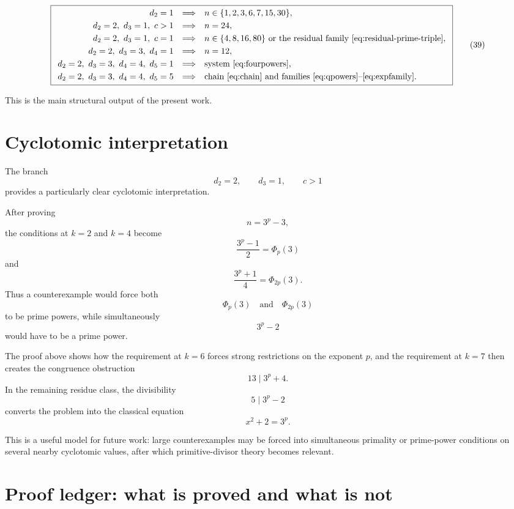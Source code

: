 \documentclass[11pt]{article}
\newcommand{\PhiC}{\Phi}
\begin{document}
\[
\boxed{
\begin{array}{rcl}
d_2=1
&\Longrightarrow&
n\in\{1,2,3,6,7,15,30\},\\[1mm]
d_2=2,\ d_3=1,\ c>1
&\Longrightarrow&
n=24,\\[1mm]
d_2=2,\ d_3=1,\ c=1
&\Longrightarrow&
n\in\{4,8,16,80\}\text{ or the residual family \eqref{eq:residual-prime-triple}},\\[1mm]
d_2=2,\ d_3=3,\ d_4=1
&\Longrightarrow&
n=12,\\[1mm]
d_2=2,\ d_3=3,\ d_4=4,\ d_5=1
&\Longrightarrow&
\text{system \eqref{eq:fourpowers}},\\[1mm]
d_2=2,\ d_3=3,\ d_4=4,\ d_5=5
&\Longrightarrow&
\text{chain \eqref{eq:chain} and families \eqref{eq:qpowers}--\eqref{eq:expfamily}}.
\end{array}
}
\tag{39}
\]

This is the main structural output of the present work.

\section{Cyclotomic interpretation}

The branch
\[
d_2=2,\qquad d_3=1,\qquad c>1
\]
provides a particularly clear cyclotomic interpretation.

After proving
\[
n=3^p-3,
\]
the conditions at \(k=2\) and \(k=4\) become
\[
\frac{3^p-1}{2}=\PhiC_p(3)
\]
and
\[
\frac{3^p+1}{4}=\PhiC_{2p}(3).
\]
Thus a counterexample would force both
\[
\PhiC_p(3)
\quad\text{and}\quad
\PhiC_{2p}(3)
\]
to be prime powers, while simultaneously
\[
3^p-2
\]
would have to be a prime power.

The proof above shows how the requirement at \(k=6\) forces strong restrictions
on the exponent \(p\), and the requirement at \(k=7\) then creates the
congruence obstruction
\[
13\mid3^p+4.
\]
In the remaining residue class, the divisibility
\[
5\mid3^p-2
\]
converts the problem into the classical equation
\[
x^2+2=3^p.
\]

This is a useful model for future work: large counterexamples may be forced
into simultaneous primality or prime-power conditions on several nearby
cyclotomic values, after which primitive-divisor theory becomes relevant.

\section{Proof ledger: what is proved and what is not}
\end{document}
